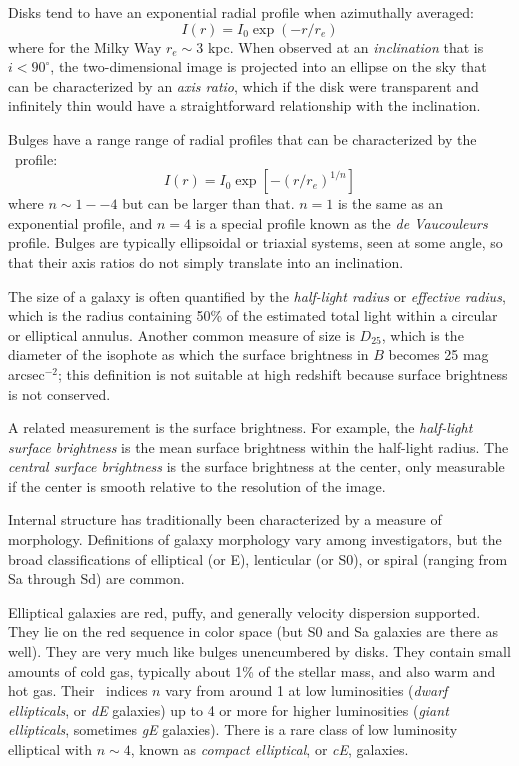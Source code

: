 Disks tend to have an exponential radial profile when azimuthally
averaged:
\begin{equation}
I(r) = I_0 \exp\left(- r / r_e\right)
\end{equation}
where for the Milky Way $r_e \sim 3$ kpc. When observed at an {\it
inclination} that is $i<90^\circ$, the two-dimensional image is
projected into an ellipse on the sky that can be characterized by an
{\it axis ratio}, which if the disk were transparent and infinitely
thin would have a straightforward relationship with the inclination.

Bulges have a range range of radial profiles that can be characterized
by the \Sersic\ profile:
\begin{equation}
I(r) = I_0 \exp\left[- \left(r / r_e\right)^{1/n}\right]
\end{equation}
where $n \sim 1--4$ but can be larger than that. $n=1$ is the same as
an exponential profile, and $n=4$ is a special profile known as the
{\it de Vaucouleurs} profile. Bulges are typically ellipsoidal or
triaxial systems, seen at some angle, so that their axis ratios do not
simply translate into an inclination.

The size of a galaxy is often quantified by the {\it half-light
radius} or {\it effective radius}, which is the radius containing 50\%
of the estimated total light within a circular or elliptical
annulus. Another common measure of size is $D_{25}$, which is the
diameter of the isophote as which the surface brightness in $B$
becomes 25 mag arcsec$^{-2}$; this definition is not suitable at high
redshift because surface brightness is not conserved.

A related measurement is the surface brightness. For example, the {\it
half-light surface brightness} is the mean surface brightness within
the half-light radius. The {\it central surface brightness} is the
surface brightness at the center, only measurable if the center is
smooth relative to the resolution of the image.

Internal structure has traditionally been characterized by a measure
of morphology. Definitions of galaxy morphology vary among
investigators, but the broad classifications of elliptical (or E),
lenticular (or S0), or spiral (ranging from Sa through Sd) are common.

Elliptical galaxies are red, puffy, and generally velocity dispersion
supported. They lie on the red sequence in color space (but S0 and Sa
galaxies are there as well). They are very much like bulges
unencumbered by disks. They contain small amounts of cold gas,
typically about 1\% of the stellar mass, and also warm and hot
gas. Their \Sersic\ indices $n$ vary from around 1 at low luminosities
({\it dwarf ellipticals}, or {\it dE} galaxies) up to 4 or more for
higher luminosities ({\it giant ellipticals}, sometimes {\it gE}
galaxies).  There is a rare class of low luminosity elliptical with
$n\sim 4$, known as {\it compact elliptical}, or {\it cE}, galaxies.

